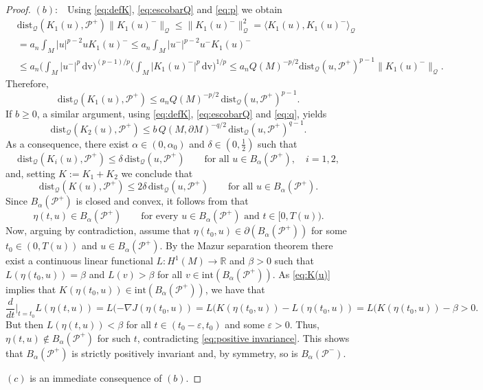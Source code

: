 \documentclass[reqno,11pt,oneside]{amsart}
\numberwithin{equation}{section}
\def\r{\mathbb{R}}
\def\eps{\varepsilon}
\def\im{\int_{M}}
\def\cP{\mathcal{P}}
\def\dv{\,\mathrm{dv}}
\def\dist{\mathrm{dist}}
\begin{document}
\begin{proof}
$(b):$ \ Using \eqref{eq:defK}, \eqref{eq:escobarQ} and \eqref{eq:p} we obtain
\begin{align*}
&\dist_\mathscr{Q}(K_1(u),\cP^+)\|K_1(u)^-\|_\mathscr{Q}\leq\|K_1(u)^-\|_\mathscr{Q}^2=\langle K_1(u),K_1(u)^-\rangle_\mathscr{Q}\\
&=a_n\im|u|^{p-2}uK_1(u)^- \leq a_n\im|u^-|^{p-2}u^-K_1(u)^-\\
&\leq a_n\Big(\im |u^-|^p\dv\Big)^{(p-1)/p}\Big(\im |K_1(u)^-|^p\dv\Big)^{1/p}\leq a_nQ(M)^{-p/2}\dist_\mathscr{Q}(u,\cP^+)^{p-1}\|K_1(u)^-\|_\mathscr{Q}.
\end{align*}
Therefore,
\begin{equation*}
\dist_\mathscr{Q}(K_1(u),\cP^+)\leq a_nQ(M)^{-p/2}\,\dist_\mathscr{Q}(u,\cP^+)^{p-1}.
\end{equation*}
If $b\geq 0$, a similar argument, using \eqref{eq:defK},  \eqref{eq:escobarQ} and \eqref{eq:q}, yields
\begin{equation*}
\dist_\mathscr{Q}(K_2(u),\cP^+)\leq b\,Q(M,\partial M)^{-q/2}\,\dist_\mathscr{Q}(u,\cP^+)^{q-1}.
\end{equation*}
As a consequence, there exist $\alpha\in(0,\alpha_0)$ and $\delta\in(0,\frac{1}{2})$ such that
\begin{equation*}
\dist_\mathscr{Q}(K_i(u),\cP^+)\leq \delta\,\dist_\mathscr{Q}(u,\cP^+)\qquad\text{for all \ }u\in B_\alpha(\cP^+),\quad i=1,2,
\end{equation*}
and, setting $K:=K_1+K_2$ we conclude that
\begin{equation} \label{eq:K(u)}
\dist_\mathscr{Q}(K(u),\cP^+)\leq 2\delta\,\dist_\mathscr{Q}(u,\cP^+)\qquad\text{for all \ }u\in B_\alpha(\cP^+).
\end{equation}
Since $B_\alpha(\cP^+)$ is closed and convex, it follows from \cite[Theorem 5.2]{d} that
\begin{equation}\label{eq:positive invariance}
\eta(t,u)\in B_\alpha(\cP^+)\qquad\text{for every \ }u\in B_\alpha(\cP^+)\text{ \ and \ }t\in[0,T(u)).
\end{equation}
Now, arguing by contradiction, assume that $\eta(t_0,u)\in \partial(B_\alpha(\cP^+))$ for some $t_0\in(0,T(u))$ and $u\in B_\alpha(\cP^+)$. By the Mazur separation theorem there exist a continuous linear functional $L:H^1(M)\to\r$ and $\beta>0$ such that $L(\eta(t_0,u))=\beta$ and $L(v)>\beta$ for all $v\in\mathrm{int}(B_\alpha(\cP^+))$. As \eqref{eq:K(u)} implies that $K(\eta(t_0,u))\in\mathrm{int}(B_\alpha(\cP^+))$, we have that
$$\frac{d}{dt}\Big|_{t=t_0}L(\eta(t,u))=L(-\nabla J(\eta(t_0,u))=L(K(\eta(t_0,u))-L(\eta(t_0,u))=L(K(\eta(t_0,u))-\beta>0.$$
But then $L(\eta(t,u))<\beta$ for all $t\in(t_0-\eps,t_0)$ and some $\eps>0$. Thus, $\eta(t,u)\notin B_\alpha(\cP^+)$ for such $t$, contradicting \eqref{eq:positive invariance}. This shows that $B_\alpha(\cP^+)$ is strictly positively invariant and, by symmetry, so is $B_\alpha(\cP^-)$.

$(c)$ is an immediate consequence of $(b)$. 
\end{proof}
\end{document}
